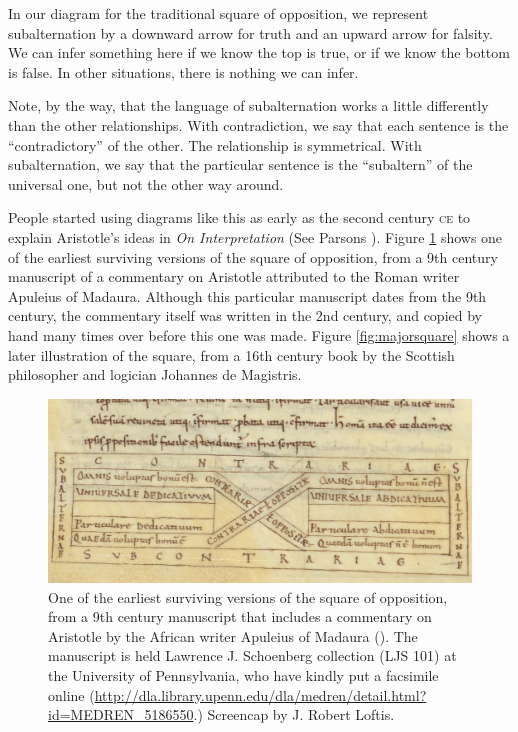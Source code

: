 In our diagram for the traditional square of opposition, we represent subalternation by a downward arrow for truth and an upward arrow for falsity. We can infer something here if we know the top is true, or if we know the bottom is false. In other situations, there is nothing we can infer.

Note, by the way, that the language of subalternation works a little differently than the other relationships. With contradiction, we say that each sentence is the ``contradictory'' of the other. The relationship is symmetrical. With subalternation, we say that the particular sentence is the ``subaltern'' of the universal one, but not the other way around.

People started using diagrams like this as early as the second century \textsc{ce} to explain Aristotle's ideas in \textit{On Interpretation} (See Parsons \cite*{Parsons1997}). Figure \ref{fig:apuleiussquare} shows one of the earliest surviving versions of the square of opposition, from a 9th century manuscript of a commentary on Aristotle attributed to the Roman writer Apuleius of Madaura. Although this particular manuscript dates from the 9th century, the commentary itself was written in the 2nd century, and copied by hand many times over before this one was made. Figure \ref{fig:majorsquare} shows a later illustration of the square, from a 16th century book by the Scottish philosopher and logician Johannes de Magistris.

\begin{figure}
\begin{mdframed}[style=mytableclearbox]
\begin{center}
\includegraphics*[scale=.4]{img/ljs101}
\end{center}
\end{mdframed}
\caption{One of the earliest surviving versions of the square of opposition, from a 9th century manuscript that includes a commentary on Aristotle by the African writer Apuleius of Madaura (\cite{Apuleius1987}). The manuscript is held Lawrence J. Schoenberg collection (LJS 101) at the University of Pennsylvania, who have kindly put a facsimile online (\url{http://dla.library.upenn.edu/dla/medren/detail.html?id=MEDREN_5186550}.)  Screencap by J. Robert Loftis.}
\label{fig:apuleiussquare}
\end{figure}


